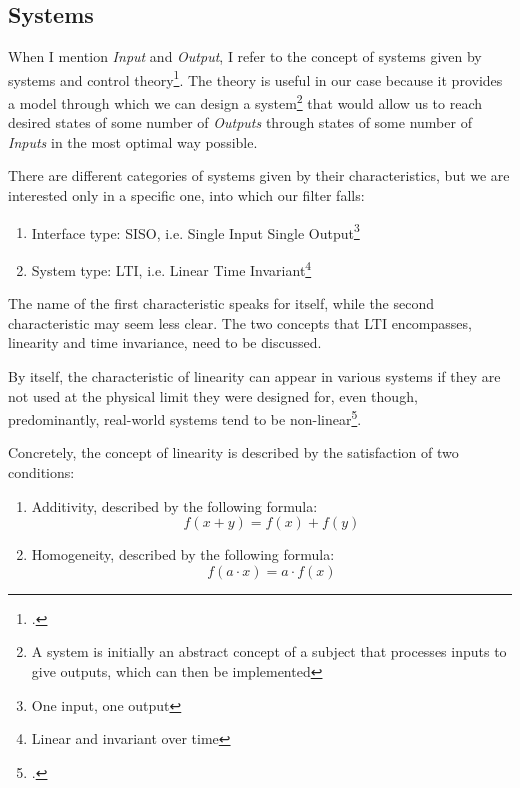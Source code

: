 \documentclass[a4paper, 10pt, final]{article} %
\begin{document}
    \subsection{Systems}\label{sec:FilterTheorySystems}
    When I mention \emph{Input} and \emph{Output}, I refer to the concept of systems given by systems and control theory\footcite[]{ControlTheory:Wiki}.
    The theory is useful in our case because it provides a model through which we can design a system\footnote{A system is initially an abstract concept of a subject that processes inputs to give outputs, which can then be implemented} that would allow us to reach desired states of some number of \emph{Outputs} through states of some number of \emph{Inputs} in the most optimal way possible.

    \begin{samepage}
        \noindent There are different categories of systems given by their characteristics, but we are interested only in a specific one, into which our filter falls:
        \begin{enumerate}[label=\emph{(\arabic*)}]
            \item Interface type: SISO, i.e. Single Input Single Output\footnote{One input, one output}
            \item System type: LTI, i.e. Linear Time Invariant\footnote{Linear and invariant over time}
        \end{enumerate}
    \end{samepage}
    The name of the first characteristic speaks for itself, while the second characteristic may seem less clear.
    The two concepts that LTI encompasses, linearity and time invariance, need to be discussed.

    By itself, the characteristic of linearity can appear in various systems if they are not used at the physical limit they were designed for, even though, predominantly, real-world systems tend to be non-linear\footcite[]{TransferFunction:Wiki}.
    \begin{samepage}
        \noindent Concretely, the concept of linearity is described by the satisfaction of two conditions:
        \begin{enumerate}[label=\emph{(\arabic*)}]
            \item Additivity, described by the following formula: \[f(x + y) = f(x) + f(y)\]
            \item Homogeneity, described by the following formula: \[f(a \cdot x) = a \cdot f(x)\]
        \end{enumerate}
    \end{samepage}
\end{document}
